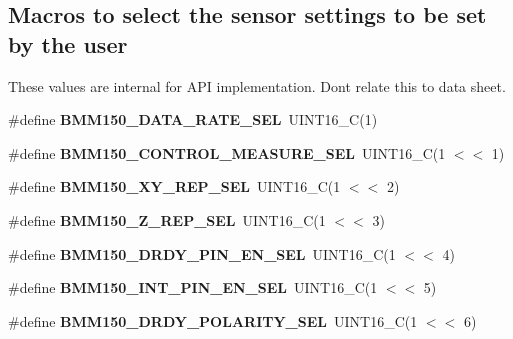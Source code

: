 \subsection*{Macros to select the sensor settings to be set by the user}
\label{_amgrpc91c1720e4fa9c470a7fd37fa7d67f97}%
These values are internal for A\+PI implementation. Don\textquotesingle{}t relate this to data sheet. \begin{DoxyCompactItemize}
\item 
\mbox{\label{group___b_m_m150_ga8a148647b00f427aa281d599f82808cd}} 
\#define {\bfseries B\+M\+M150\+\_\+\+D\+A\+T\+A\+\_\+\+R\+A\+T\+E\+\_\+\+S\+EL}~U\+I\+N\+T16\+\_\+C(1)
\item 
\mbox{\label{group___b_m_m150_ga51721809d21583d12cdd9c3ff5ecd915}} 
\#define {\bfseries B\+M\+M150\+\_\+\+C\+O\+N\+T\+R\+O\+L\+\_\+\+M\+E\+A\+S\+U\+R\+E\+\_\+\+S\+EL}~U\+I\+N\+T16\+\_\+C(1 $<$$<$ 1)
\item 
\mbox{\label{group___b_m_m150_gac00bc4d1e75cfbc1c662a24203c025f3}} 
\#define {\bfseries B\+M\+M150\+\_\+\+X\+Y\+\_\+\+R\+E\+P\+\_\+\+S\+EL}~U\+I\+N\+T16\+\_\+C(1 $<$$<$ 2)
\item 
\mbox{\label{group___b_m_m150_ga0c23f45dd9c1715af8fc1196a453a967}} 
\#define {\bfseries B\+M\+M150\+\_\+\+Z\+\_\+\+R\+E\+P\+\_\+\+S\+EL}~U\+I\+N\+T16\+\_\+C(1 $<$$<$ 3)
\item 
\mbox{\label{group___b_m_m150_gae41907b55a2922bb2ec57b3ff4c937be}} 
\#define {\bfseries B\+M\+M150\+\_\+\+D\+R\+D\+Y\+\_\+\+P\+I\+N\+\_\+\+E\+N\+\_\+\+S\+EL}~U\+I\+N\+T16\+\_\+C(1 $<$$<$ 4)
\item 
\mbox{\label{group___b_m_m150_ga2545bda4d960ac6b3ff3ff2e1eab1fb1}} 
\#define {\bfseries B\+M\+M150\+\_\+\+I\+N\+T\+\_\+\+P\+I\+N\+\_\+\+E\+N\+\_\+\+S\+EL}~U\+I\+N\+T16\+\_\+C(1 $<$$<$ 5)
\item 
\mbox{\label{group___b_m_m150_ga1db8e08e38c5608d98da56929e31edb8}} 
\#define {\bfseries B\+M\+M150\+\_\+\+D\+R\+D\+Y\+\_\+\+P\+O\+L\+A\+R\+I\+T\+Y\+\_\+\+S\+EL}~U\+I\+N\+T16\+\_\+C(1 $<$$<$ 6)
\item 
\mbox{\label{group___b_m_m150_ga864cced2dc2198714a983caabcc15104}} 

\end{DoxyCompactItemize}
